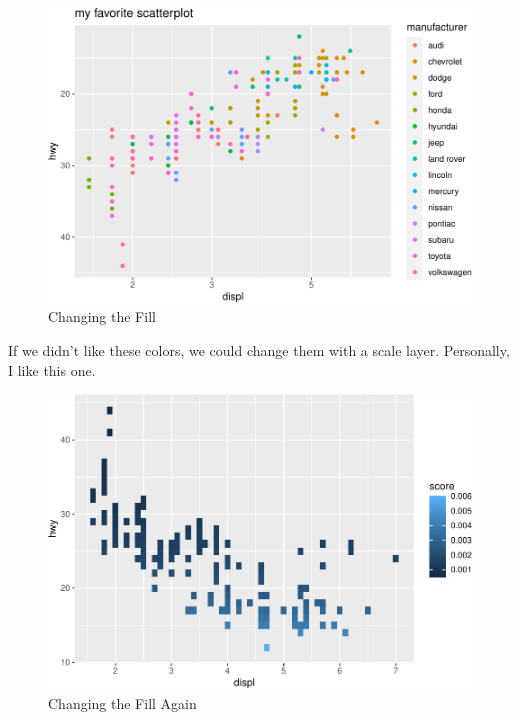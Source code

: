 \documentclass[
  12pt,
]{krantz}
\makeatletter
\newenvironment{Shaded}{\begin{snugshade}}{\end{snugshade}}
\newcommand{\AttributeTok}[1]{\textcolor[rgb]{0.61,0.61,0.61}{#1}}
\newcommand{\DecValTok}[1]{\textcolor[rgb]{0.06,0.06,0.06}{#1}}
\newcommand{\FunctionTok}[1]{\textcolor[rgb]{0,0,0}{#1}}
\newcommand{\NormalTok}[1]{#1}
\newcommand{\OtherTok}[1]{\textcolor[rgb]{0.37,0.37,0.37}{#1}}
\newcommand{\SpecialCharTok}[1]{\textcolor[rgb]{0,0,0}{#1}}
\newenvironment{kframe}{%
\medskip{}
\setlength{\fboxsep}{.8em}
 \def\at@end@of@kframe{}%
 \ifinner\ifhmode%
  \def\at@end@of@kframe{\end{minipage}}%
  \begin{minipage}{\columnwidth}%
 \fi\fi%
 \def\FrameCommand##1{\hskip\@totalleftmargin \hskip-\fboxsep
 \colorbox{shadecolor}{##1}\hskip-\fboxsep
     \hskip-\linewidth \hskip-\@totalleftmargin \hskip\columnwidth}%
 \MakeFramed {\advance\hsize-\width
   \@totalleftmargin\z@ \linewidth\hsize
   \@setminipage}}%
 {\par\unskip\endMakeFramed%
 \at@end@of@kframe}
\renewenvironment{Shaded}{\begin{kframe}}{\end{kframe}}
\makeatother
\begin{document}
\begin{figure}
\centering
\includegraphics{r_and_python_book_files/figure-latex/unnamed-chunk-173-1.pdf}
\caption{\label{fig:unnamed-chunk-173}Changing the Fill}
\end{figure}

If we didn't like these colors, we could change them with a scale layer. Personally, I like this one.

\begin{Shaded}
\end{Shaded}

\begin{figure}
\centering
\includegraphics{r_and_python_book_files/figure-latex/unnamed-chunk-174-1.pdf}
\caption{\label{fig:unnamed-chunk-174}Changing the Fill Again}
\end{figure}
\end{document}

